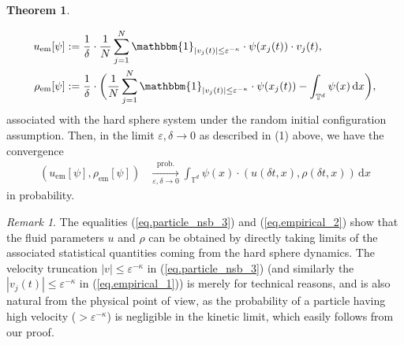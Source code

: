 \documentclass[10pt, reqno]{amsart}
\newcommand{\Tb}{\mathbb T}
\theoremstyle{definition}
\newtheorem{mainthm}{Theorem}
\theoremstyle{remark}
\newtheorem{remark}[theorem]{Remark}
\numberwithin{equation}{section}
\begin{document}
\begin{mainthm}
\begin{enumerate}
\begin{equation}
\begin{aligned}
u_{\mathrm{em}}[\psi]&:=\frac{1}{\delta}\cdot\frac{1}{N}\sum_{j=1}^N \mathbbm{1}_{|v_j(t)|\leq \varepsilon^{-\kappa}}\cdot\psi(x_j(t))\cdot v_j(t),\\
\rho_{\mathrm{em}}[\psi]&:=\frac{1}{\delta}\cdot\bigg(\frac{1}{N}\sum_{j=1}^N \mathbbm{1}_{|v_j(t)|\leq \varepsilon^{-\kappa}}\cdot\psi(x_j(t))-\int_{\Tb^d}\psi(x)\,\mathrm{d}x\bigg),
\end{aligned}
\end{equation} associated with the hard sphere system under the random initial configuration assumption. Then, in the limit $\varepsilon,\delta\to 0$ as described in (1) above, we have the convergence
\begin{equation}\label{eq.empirical_2}
\begin{aligned}(u_{\mathrm{em}}[\psi],\rho_{\mathrm{em}}[\psi])&\xrightarrow[\varepsilon,\delta\to 0]{\mathrm{prob.}}\int_{\Tb^d}\psi(x)\cdot (u({\delta t},x),\rho({\delta t},x))\,\mathrm{d}x
\end{aligned}
\end{equation} in probability.
\end{enumerate}
\end{mainthm}
\begin{remark}\label{rem.th2} The equalities (\ref{eq.particle_nsb_3}) and (\ref{eq.empirical_2}) show that the fluid parameters $u$ and $\rho$ can be obtained by directly taking limits of the associated statistical quantities coming from the hard sphere dynamics. The velocity truncation $|v|\leq \varepsilon^{-\kappa}$ in (\ref{eq.particle_nsb_3}) (and similarly the $|v_j(t)|\leq \varepsilon^{-\kappa}$ in (\ref{eq.empirical_1})) is merely for technical reasons, and is also natural from the physical point of view, as the probability of a particle having high velocity ($>\varepsilon^{-\kappa}$) is negligible in the kinetic limit, which easily follows from our proof.
\end{remark}
\end{document}
